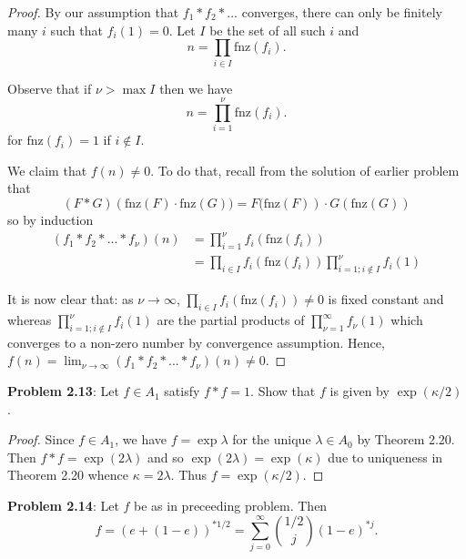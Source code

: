 \documentclass{article}
\newcommand{\fnz}{\text{fnz}}
\begin{document}
\begin{proof}
By our assumption that $f_1 * f_2 * ...$ converges, there can only be finitely many $i$ such that $f_i(1) = 0$. Let $I$ be the set of all such $i$ and
$$n = \prod_{i \in I} \fnz(f_i).$$

Observe that if $\nu > \max I$ then we have
$$n = \prod_{i = 1}^{\nu} \fnz(f_i).$$
for $\fnz(f_i) = 1$ if $i \not\in I$.

We claim that $f(n) \not= 0$. To do that, recall from the solution of earlier problem that
$$(F * G)\left(\fnz(F) \cdot \fnz(G)) = F(\fnz(F)\right) \cdot G(\fnz(G))$$
so by induction
\begin{align*}
(f_1 * f_2 * ... * f_\nu)(n) &= \prod_{i=1}^{\nu} f_i(\fnz(f_i))\\
&= \prod_{i \in I} f_i(\fnz(f_i)) \prod_{i=1; i \not\in I}^{\nu} f_i(1)
\end{align*}

It is now clear that: as $\nu \rightarrow \infty$, $\prod_{i \in I} f_i(\fnz(f_i)) \not= 0$ is fixed constant and whereas $\prod_{i=1; i \not\in I}^{\nu} f_i(1)$ are the partial products of $\prod_{\nu=1}^{\infty} f_\nu(1)$ which converges to a non-zero number by convergence assumption. Hence, $f(n) = \lim_{\nu \rightarrow \infty} (f_1 * f_2 * ... * f_\nu)(n) \not= 0$.
\end{proof}

\textbf{Problem 2.13}: Let $f \in A_1$ satisfy $f * f = 1$. Show that $f$ is given by $\exp(\kappa/2)$.

\begin{proof}
Since $f \in A_1$, we have $f = \exp \lambda$ for the unique $\lambda \in A_0$ by Theorem 2.20. Then
$f * f = \exp(2 \lambda)$ and so $\exp(2 \lambda) = \exp(\kappa)$ due to uniqueness in Theorem 2.20 whence $\kappa = 2 \lambda$. Thus $f = \exp(\kappa/2)$.
\end{proof}

\textbf{Problem 2.14}: Let $f$ be as in preceeding problem. Then
$$f = (e + (1 - e))^{*1/2} = \sum_{j = 0}^{\infty} \binom{1/2}{j} (1 - e)^{*j}.$$
\end{document}
